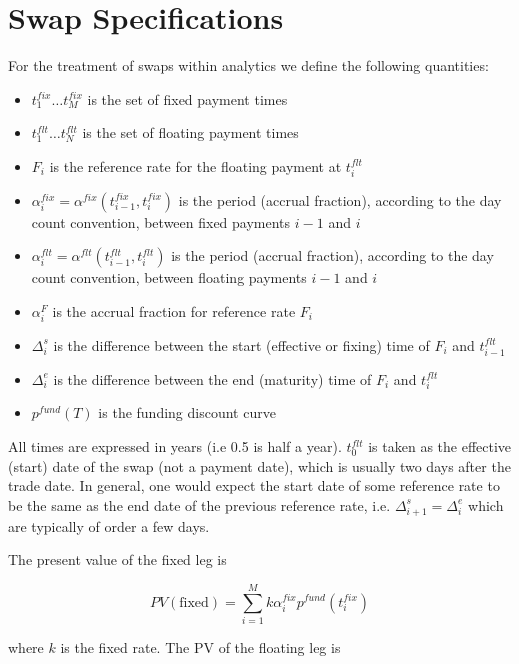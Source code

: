 \section{Swap Specifications}

For the treatment of swaps within analytics we define the following quantities:

\begin{itemize}
\item $t_1^{fix} \ldots t_M^{fix}$ is the set of fixed payment times 
\item $t_1^{flt} \ldots t_N^{flt}$ is the set of floating payment times
\item  $F_i$ is the reference rate for the floating payment at $t_i^{flt}$
\item  $\alpha^{fix}_i = \alpha^{fix}(t_{i-1}^{fix},t_{i}^{fix})$ is the period (accrual fraction), according to the day count convention, between fixed payments $i-1$ and $i$
\item  $\alpha^{flt}_i = \alpha^{flt}(t_{i-1}^{flt},t_{i}^{flt})$ is the period (accrual fraction), according to the day count convention, between floating payments $i-1$ and $i$
\item  $\alpha^{F}_i$ is the accrual fraction for reference rate  $F_i$
\item  $\Delta^s_i$ is the difference between the start (effective or fixing) time of $F_i$ and $t^{flt}_{i-1}$
\item $\Delta^e_i$ is the difference between the end (maturity) time of $F_i$ and $t^{flt}_{i}$
\item $p^{fund}(T)$ is the funding discount curve
\end{itemize}

All times are expressed in years (i.e 0.5 is half a year). $t_0^{flt}$ is taken as the effective (start) date of the swap (not a payment date), which is usually two days after the trade date.  In general, one would expect  the start date of some reference rate to be the same as the end date of the previous reference rate, i.e.  $\Delta^s_{i+1}=\Delta^e_{i}$ which are typically of order a few days. 

The present value of the fixed leg is

\begin{equation}
PV(\text{fixed}) = \sum^M_{i=1} k \alpha^{fix}_ip^{fund}(t^{fix}_i)
\end{equation}

where $k$ is the fixed rate. The PV of the floating leg is 


